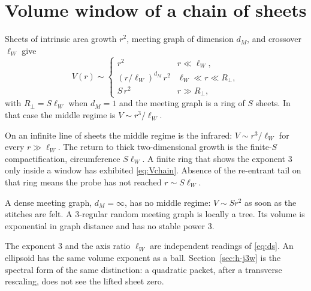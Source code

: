 \section{Volume window of a chain of sheets}
\label{sec:h-weave}

Sheets of intrinsic area growth \(r^2\), meeting graph of dimension
\(d_M\), and crossover \(\ell_W\) give
\begin{equation}
\label{eq:Vchain}
V(r)\sim
\begin{cases}
r^2 & r\ll\ell_W,\\
(r/\ell_W)^{d_M}\,r^2 & \ell_W\ll r\ll R_\perp,\\
S\,r^2 & r\gg R_\perp,
\end{cases}
\end{equation}
with \(R_\perp=S\ell_W\) when \(d_M=1\) and the meeting graph is a ring of
\(S\) sheets.
In that case the middle regime is \(V\sim r^3/\ell_W\).

On an infinite line of sheets the middle regime is the infrared:
\(V\sim r^3/\ell_W\) for every \(r\gg\ell_W\).
The return to thick two-dimensional growth is the finite-\(S\)
compactification, circumference \(S\ell_W\).
A finite ring that shows the exponent \(3\) only inside a window has
exhibited \eqref{eq:Vchain}.
Absence of the re-entrant tail on that ring means the probe has not
reached \(r\sim S\ell_W\).

A dense meeting graph, \(d_M=\infty\), has no middle regime:
\(V\sim S r^2\) as soon as the stitches are felt.
A \(3\)-regular random meeting graph is locally a tree.
Its volume is exponential in graph distance and has no stable power \(3\).

The exponent \(3\) and the axis ratio \(\ell_W\) are independent readings of
\eqref{eq:ds}.
An ellipsoid has the same volume exponent as a ball.
Section~\ref{sec:h-j3w} is the spectral form of the same distinction:
a quadratic packet, after a transverse rescaling, does not see the
lifted sheet zero.
